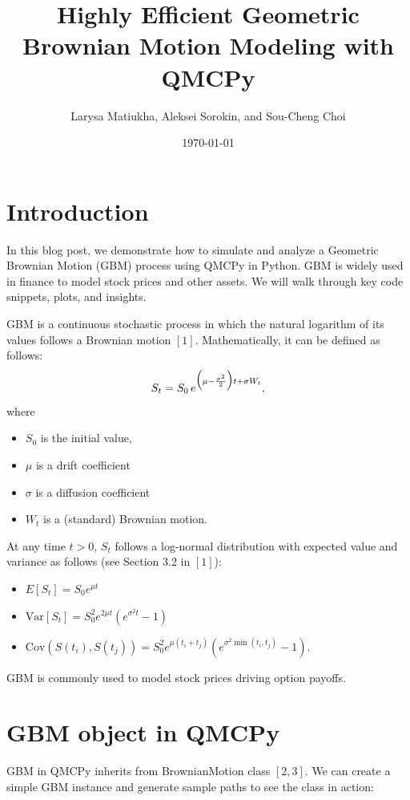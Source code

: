 \documentclass{article}
\title{Highly Efficient Geometric Brownian Motion Modeling with QMCPy}
\author{Larysa Matiukha, Aleksei Sorokin, and Sou-Cheng Choi}
\date{\today}
\begin{document}
\maketitle

\section{Introduction}

In this blog post, we demonstrate how to simulate and analyze a Geometric Brownian Motion (GBM) process using QMCPy in Python.
GBM is widely used in finance to model stock prices and other assets. 
We will walk through key code snippets, plots, and insights.

GBM is a continuous stochastic process in which the natural logarithm of its values follows a Brownian motion $[1]$.
Mathematically, it can be defined as follows:
$$\large{S_t = S_0 \, e^{\big(\mu - \frac{\sigma^2}{2}\big)  t + \sigma W_t}}, \label{gbm}$$
where
\begin{itemize}
\item $S_0$ is the initial value, 
\item $\mu$ is a drift coefficient
\item $\sigma$ is a diffusion coefficient  
\item $W_t$ is a (standard) Brownian motion.
\end{itemize}

At any time $t > 0$, $S_t$ follows a log-normal distribution with expected value and variance as follows (see Section 3.2 in $[1]$):
\begin{itemize}
\item
 $E[S_t] = S_0 e^{\mu t}$
\item $\text{Var}[S_t] = S_0^2 e^{2\mu t}(e^{\sigma^2 t} - 1)$
\item   $  
    \text{Cov}(S(t_i), S(t_j)) = S_0^2 e^{\mu(t_i + t_j)} \left(e^{\sigma^2 \min(t_i, t_j)} - 1\right).$
\end{itemize}

GBM is commonly used to model stock prices driving option payoffs. 

\section{GBM object in QMCPy}

GBM in QMCPy inherits from BrownianMotion class $[2, 3]$. 
We can create a simple GBM instance and generate sample paths to see the class in action:
\end{document}

